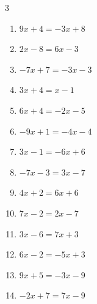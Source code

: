 \begin{multicols}{3}
\begin{enumerate}
  \item $9x+4=-3x+8$


  \item $2x-8=6x-3$


  \item $-7x+7=-3x-3$


  \item $3x+4=x-1$


  \item $6x+4=-2x-5$


  \item $-9x+1=-4x-4$

        \phantom{$\displaystyle x=1$}

\columnbreak %

  \item $3x-1=-6x+6$


  \item $-7x-3=3x-7$


  \item $4x+2=6x+6$

        \phantom{$\displaystyle x=-2$}

  \item $7x-2=2x-7$

        \phantom{$\displaystyle x=-1$}

  \item $3x-6=7x+3$


  \item $6x-2=-5x+3$


  \item $9x+5=-3x-9$


  \item $-2x+7=7x-9$


\end{enumerate}
\end{multicols}
